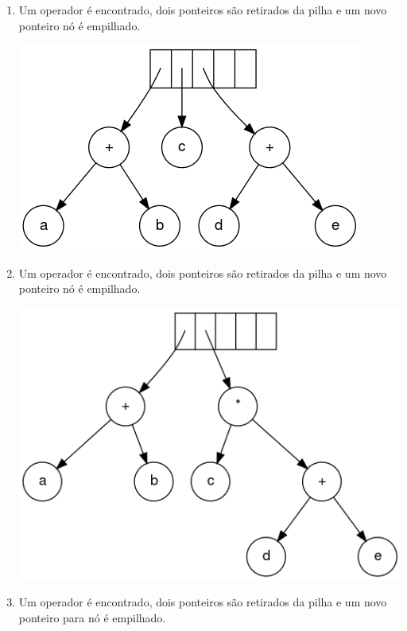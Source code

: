\begin{enumerate}
\item Um operador é encontrado, dois ponteiros são retirados da pilha e um novo ponteiro nó é empilhado.

\includegraphics[scale=0.5]{images/passo4.png}

\item Um operador é encontrado, dois ponteiros são retirados da pilha e um novo ponteiro nó é empilhado.

\includegraphics[scale=0.5]{images/passo5.png}

\item Um operador é encontrado, dois ponteiros são retirados da pilha e um novo ponteiro para nó é empilhado.


\end{enumerate}

